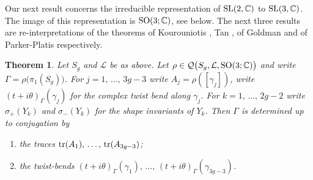 \documentclass[11pt]{amsart}
\newtheorem{theorem}{Theorem}[section]
\numberwithin{equation}{section}
\begin{document}

%
%

Our next result concerns the irreducible representation of ${\rm SL}(2,{\mathbb C})$ to ${\rm SL}(3,{\mathbb C})$. The
image of this representation is ${\rm SO}(3;{\mathbb C})$, see below. The next three results are re-interpretations
of the theorems of Kourouniotis \cite{Kou}, Tan \cite{Tan}, of Goldman \cite{Gol} and of Parker-Platis \cite{PP}
respectively.

\begin{theorem}\label{thm:main-SO(3,C)} 
Let $S_g$ and ${\mathcal L}$ be as above. Let $\rho\in{\mathcal Q}\bigl(S_g,{\mathcal L}, {\rm SO}(3;{\mathbb C})\bigr)$ and write 
$\Gamma=\rho\bigl(\pi_1(S_g)\bigr)$.
For $j=1,\,\ldots,\,3g-3$ write $A_j=\rho([\gamma_j])$, write $(t+i\theta)_\Gamma(\gamma_j)$ 
for the complex twist bend along $\gamma_j$. For $k=1,\,\ldots,\,2g-2$ write 
$\sigma_+(Y_k)$ and $\sigma_-(Y_k)$ for the shape invariants of $Y_k$. 
Then $\Gamma$ is determined up to conjugation by
\begin{enumerate}
\item[(1)] the traces ${\rm tr}(A_1),\,\ldots,\,{\rm tr}(A_{3g-3})$; 
\item[(2)] the twist-bends $(t+i\theta)_\Gamma(\gamma_1),\,\ldots,\,(t+i\theta)_\Gamma(\gamma_{3g-3})$.
\end{enumerate}
\end{theorem}
\end{document}
